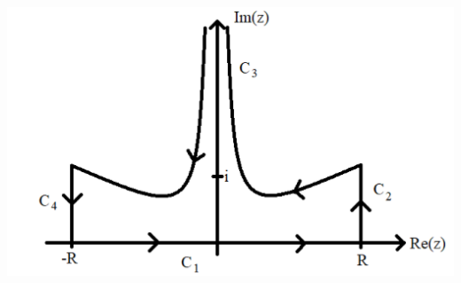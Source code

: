 \documentclass{article}
\begin{document}
\begin{itemize}
\begin{itemize}
        \begin{center}
            \includegraphics[scale = 0.4]{prob1bcontour.PNG}
        \end{center}


\end{itemize}
\end{itemize}
\end{document}
